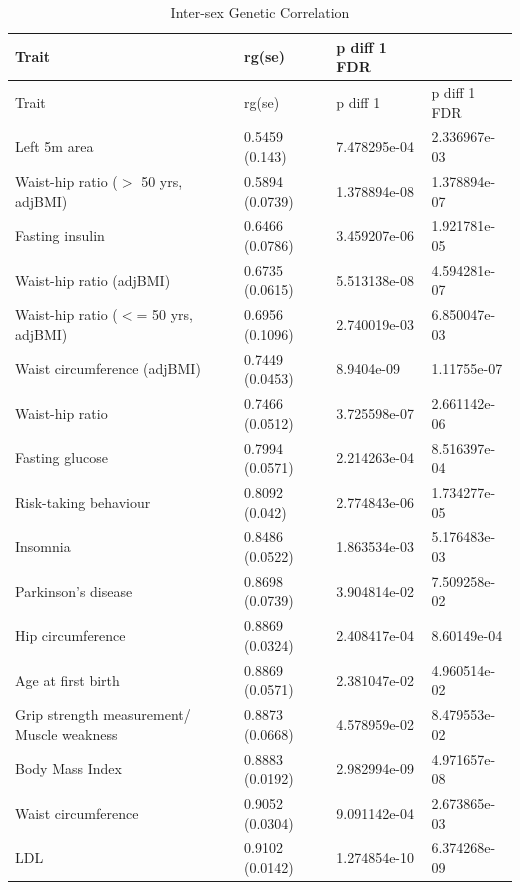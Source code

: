 \documentclass{article}\usepackage[]{graphicx}\usepackage[dvipsnames]{xcolor}
\begin{document}
\renewcommand{\arraystretch}{1.3}

\setcounter{table}{2}
\renewcommand{\tablename}{Supplementary Table} %


\begin{longtable}{p{6cm}|p{2.5cm}|p{2.5cm}|p{2.5cm}}
\caption{Inter-sex Genetic Correlation}\\
  \hline
Trait & rg(se) & p diff 1 FDR \\ 
  \hline
Trait & rg(se) & p diff 1 & p diff 1 FDR \\ 
  \hline

Left 5m area & 0.5459 (0.143) & 7.478295e-04 & 2.336967e-03 \\ 
  Waist-hip ratio ($>$ 50 yrs, adjBMI) & 0.5894 (0.0739) & 1.378894e-08 & 1.378894e-07 \\ 
  Fasting insulin & 0.6466 (0.0786) & 3.459207e-06 & 1.921781e-05 \\ 
  Waist-hip ratio (adjBMI) & 0.6735 (0.0615) & 5.513138e-08 & 4.594281e-07 \\ 
  Waist-hip ratio ($<$= 50 yrs, adjBMI) & 0.6956 (0.1096) & 2.740019e-03 & 6.850047e-03 \\ 
  Waist circumference (adjBMI) & 0.7449 (0.0453) & 8.9404e-09 & 1.11755e-07 \\ 
  Waist-hip ratio  & 0.7466 (0.0512) & 3.725598e-07 & 2.661142e-06 \\ 
  Fasting glucose & 0.7994 (0.0571) & 2.214263e-04 & 8.516397e-04 \\ 
  Risk-taking behaviour & 0.8092 (0.042) & 2.774843e-06 & 1.734277e-05 \\ 
  Insomnia & 0.8486 (0.0522) & 1.863534e-03 & 5.176483e-03 \\ 
  Parkinson's disease & 0.8698 (0.0739) & 3.904814e-02 & 7.509258e-02 \\ 
  Hip circumference  & 0.8869 (0.0324) & 2.408417e-04 & 8.60149e-04 \\ 
  Age at first birth  & 0.8869 (0.0571) & 2.381047e-02 & 4.960514e-02 \\ 
  Grip strength measurement/ Muscle weakness & 0.8873 (0.0668) & 4.578959e-02 & 8.479553e-02 \\ 
  Body Mass Index  & 0.8883 (0.0192) & 2.982994e-09 & 4.971657e-08 \\ 
  Waist circumference  & 0.9052 (0.0304) & 9.091142e-04 & 2.673865e-03 \\ 
  LDL & 0.9102 (0.0142) & 1.274854e-10 & 6.374268e-09 \\ 

\end{longtable}
\end{document}
